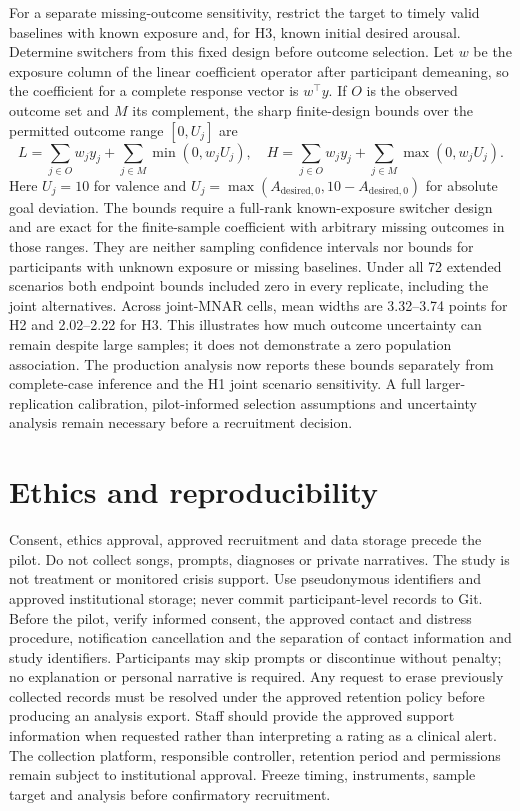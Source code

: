 \documentclass[11pt]{article}
\begin{document}
For a separate missing-outcome sensitivity, restrict the target to timely valid baselines with known exposure and, for H3, known initial desired arousal. Determine switchers from this fixed design before outcome selection. Let $w$ be the exposure column of the linear coefficient operator after participant demeaning, so the coefficient for a complete response vector is $w^\top y$. If $O$ is the observed outcome set and $M$ its complement, the sharp finite-design bounds over the permitted outcome range $[0,U_j]$ are
\[
 L=\sum_{j\in O}w_jy_j+\sum_{j\in M}\min(0,w_jU_j),
 \quad
 H=\sum_{j\in O}w_jy_j+\sum_{j\in M}\max(0,w_jU_j).
\]
Here $U_j=10$ for valence and $U_j=\max(A_{\mathrm{desired},0},10-A_{\mathrm{desired},0})$ for absolute goal deviation. The bounds require a full-rank known-exposure switcher design and are exact for the finite-sample coefficient with arbitrary missing outcomes in those ranges. They are neither sampling confidence intervals nor bounds for participants with unknown exposure or missing baselines. Under all 72 extended scenarios both endpoint bounds included zero in every replicate, including the joint alternatives. Across joint-MNAR cells, mean widths are 3.32--3.74 points for H2 and 2.02--2.22 for H3. This illustrates how much outcome uncertainty can remain despite large samples; it does not demonstrate a zero population association. The production analysis now reports these bounds separately from complete-case inference and the H1 joint scenario sensitivity. A full larger-replication calibration, pilot-informed selection assumptions and uncertainty analysis remain necessary before a recruitment decision.

\section{Ethics and reproducibility}
Consent, ethics approval, approved recruitment and data storage precede the pilot. Do not collect songs, prompts, diagnoses or private narratives. The study is not treatment or monitored crisis support. Use pseudonymous identifiers and approved institutional storage; never commit participant-level records to Git. Before the pilot, verify informed consent, the approved contact and distress procedure, notification cancellation and the separation of contact information and study identifiers. Participants may skip prompts or discontinue without penalty; no explanation or personal narrative is required. Any request to erase previously collected records must be resolved under the approved retention policy before producing an analysis export. Staff should provide the approved support information when requested rather than interpreting a rating as a clinical alert. The collection platform, responsible controller, retention period and permissions remain subject to institutional approval. Freeze timing, instruments, sample target and analysis before confirmatory recruitment.
\end{document}
